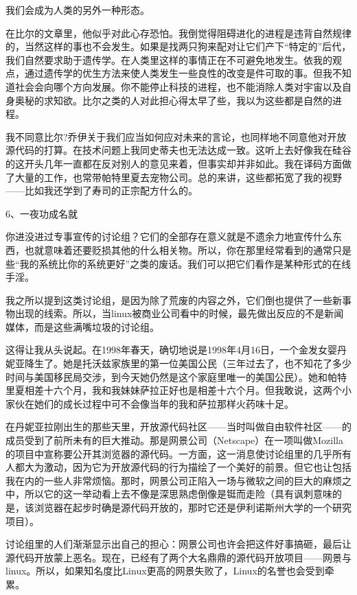 我们会成为人类的另外一种形态。

在比尔的文章里，他似乎对此心存恐怕。我倒觉得阻碍进化的进程是违背自然规律的，当然这样的事也不会发生。如果是找两只狗来配对让它们产下“特定的”后代，我们自然要求助于遗传学。在人类里这样的事情正在不可避免地发生。依我的观点，通过遗传学的优生方法来使人类发生一些良性的改变是件可取的事。但我不知道社会会向哪个方向发展。你不能停止科技的进程，也不能消除人类对宇宙以及自身奥秘的求知欲。比尔之类的人对此担心得太早了些，我以为这些都是自然的进程。

我不同意比尔?乔伊关于我们应当如何应对未来的言论，也同样地不同意他对开放源代码的打算。在技术问题上我同史蒂夫也无法达成一致。这听上去好像我在硅谷的这开头几年一直都在反对别人的意见来着，但事实却并非如此。我在译码方面做了大量的工作，也常带帕特里夏去宠物公司。总的来讲，这些都拓宽了我的视野——比如我还学到了寿司的正宗配方什么的。

 
6、一夜功成名就

你进没进过专事宣传的讨论组？它们的全部存在意义就是不遗余力地宣传什么东西，也就意味着还要贬损其他的什么相关物。所以，你在那里经常看到的通常只是些“我的系统比你的系统更好”之类的废话。我们可以把它们看作是某种形式的在线手淫。

我之所以提到这类讨论组，是因为除了荒废的内容之外，它们倒也提供了一些新事物出现的线索。所以，当linux被商业公司看中的时候，最先做出反应的不是新闻媒体，而是这些满嘴垃圾的讨论组。

这得让我从头说起。在1998年春天，确切地说是1998年4月16日，一个金发女婴丹妮亚降生了。她是托沃兹家族里的第一位美国公民（三年过去了，也不知花了多少时间与美国移民局交涉，到今天她仍然是这个家庭里唯一的美国公民）。她和帕特里夏相差十六个月，我和我妹妹萨拉正好也是相差十六个月。但我敢说，这两个小家伙在她们的成长过程中可不会像当年的我和萨拉那样火药味十足。

在丹妮亚拉刚出生的那些天里，开放源代码社区——当时叫做自由软件社区——的成员受到了前所未有的巨大推动。那是网景公司（Netscape）在一项叫做Mozilla的项目中宣称要公开其浏览器的源代码。一方面，这一消息使讨论组里的几乎所有人都大为激动，因为它为开放源代码的行为描绘了一个美好的前景。但它也让包括我在内的一些人非常烦恼。那时，网景公司正陷入一场与微软之间的巨大的麻烦之中，所以它的这一举动看上去不像是深思熟虑倒像是铤而走险（具有讽刺意味的是，该浏览器在起步时确是源代码开放的，那时它还是伊利诺斯州大学的一个研究项目）。

讨论组里的人们渐渐显示出自己的担心：网景公司也许会把这件好事搞砸，最后让源代码开放蒙上恶名。现在，已经有了两个大名鼎鼎的源代码开放项目——网景与linux。所以，如果知名度比Linux更高的网景失败了，Linux的名誉也会受到牵累。

